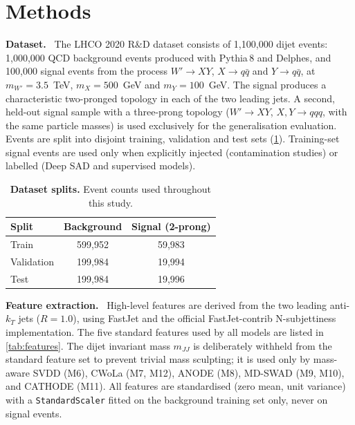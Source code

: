 \documentclass[11pt,a4paper]{article}
\newcommand{\runin}[1]{\par\vspace{2pt}\textbf{#1.}\ }
\newcommand{\mjj}{m_{JJ}}
\newcommand{\code}[1]{\texttt{#1}}
\begin{document}
\section{Methods}

\runin{Dataset}
The LHCO 2020 R\&D dataset\cite{Kasieczka2021,Kasieczka2019data} consists of
1,100,000 dijet events: 1,000,000 QCD background events produced with
Pythia\,8\cite{Sjostrand2015} and Delphes,\cite{deFavereau2014} and
100,000 signal events from the process $W' \to XY$,
$X \to q\bar{q}$ and $Y \to q\bar{q}$, at $m_{W'} = 3.5$~TeV,
$m_X = 500$~GeV and $m_Y = 100$~GeV. The signal produces a
characteristic two-pronged topology in each of the two leading jets.
A second, held-out signal sample with a three-prong topology
($W' \to XY$, $X,Y \to qqq$, with the same particle masses) is used exclusively for
the generalisation evaluation. Events are split into disjoint training,
validation and test sets (\cref{tab:splits}). Training-set signal events
are used only when explicitly injected (contamination studies) or
labelled (Deep SAD and supervised models).

\begin{table}[t]
\centering
\caption{\textbf{Dataset splits.} Event counts used throughout this study.}
\label{tab:splits}
\begin{tabular}{lcc}
\toprule
Split & Background & Signal (2-prong) \\
\midrule
Train & 599,952 & 59,983 \\
Validation & 199,984 & 19,994 \\
Test & 199,984 & 19,996 \\
\bottomrule
\end{tabular}
\end{table}

\runin{Feature extraction}
High-level features are derived from the two leading anti-$k_T$ jets\cite{Cacciari2008}
($R = 1.0$), using FastJet\cite{Cacciari2012} and the official FastJet-contrib N-subjettiness
implementation.\cite{Thaler2011} The five standard features used by
all models are listed in \cref{tab:features}. The dijet invariant mass
$\mjj$ is deliberately withheld from the standard feature set to prevent
trivial mass sculpting; it is used only by mass-aware SVDD (M6), CWoLa (M7, M12), ANODE (M8), MD-SWAD (M9, M10), and CATHODE (M11). All features are standardised (zero mean, unit variance)
with a \code{StandardScaler}\cite{Pedregosa2011} fitted on the background training set only,
never on signal events.
\end{document}
